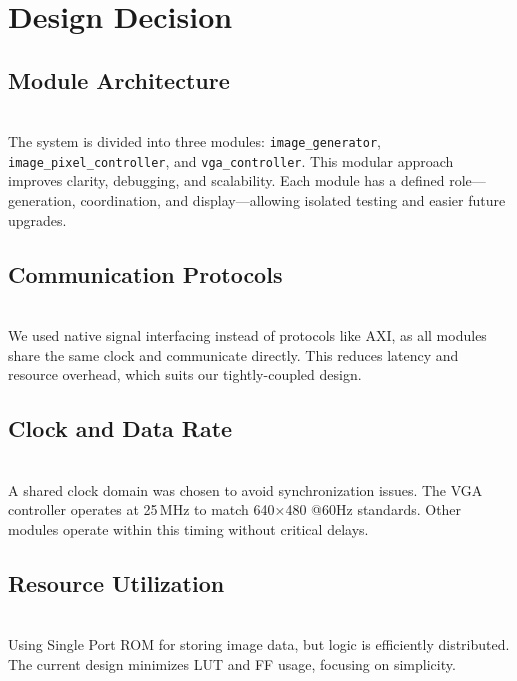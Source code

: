 \section{Design Decision}

\subsection{{Module Architecture}} \\
The system is divided into three modules: \texttt{image\_generator}, \texttt{image\_pixel\_controller}, and \texttt{vga\_controller}. This modular approach improves clarity, debugging, and scalability. Each module has a defined role—generation, coordination, and display—allowing isolated testing and easier future upgrades.

\subsection{{Communication Protocols}} \\
We used native signal interfacing instead of protocols like AXI, as all modules share the same clock and communicate directly. This reduces latency and resource overhead, which suits our tightly-coupled design.


\subsection{{Clock and Data Rate}} \\
A shared clock domain was chosen to avoid synchronization issues. The VGA controller operates at 25\,MHz to match 640×480 @60Hz standards. Other modules operate within this timing without critical delays.

\subsection{{Resource Utilization}} \\
Using Single Port ROM for storing image data, but logic is efficiently distributed. The current design minimizes LUT and FF usage, focusing on simplicity.
